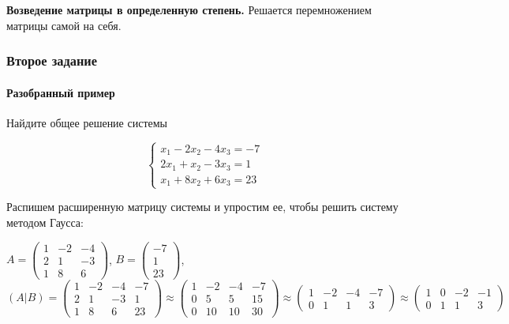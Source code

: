 \documentclass{article}
\begin{document}
\begin{flushleft}
\textbf{Возведение матрицы в определенную степень.} Решается перемножением матрицы самой на себя. 


\subsubsection{Второе задание}

\paragraph{Разобранный пример}

Найдите общее решение системы

\begin{equation}
    \begin{cases}
        x_1 - 2x_2 - 4x_3 = -7 \\
        2x_1 + x_2 - 3x_3 = 1 \\
        x_1 + 8x_2 + 6x_3 = 23
    \end{cases}
\end{equation}

Распишем расширенную матрицу системы и упростим ее, чтобы решить систему методом Гаусса:

$A = \begin{pmatrix}
    1 & -2 & -4 \\
    2 & 1 & -3 \\
    1 & 8 & 6
\end{pmatrix}$, $B = \begin{pmatrix}
    -7 \\
    1 \\
    23
\end{pmatrix}$, $(A|B) = \begin{pmatrix}
    1 & -2 & -4 & -7 \\
    2 & 1 & -3 & 1 \\
    1 & 8 & 6 & 23
\end{pmatrix} \approx \begin{pmatrix}
    1 & -2 & -4 & -7 \\
    0 & 5 & 5 & 15 \\
    0 & 10 & 10 & 30
\end{pmatrix} \approx \begin{pmatrix}
    1 & -2 & -4 & -7 \\
    0 & 1 & 1 & 3
\end{pmatrix} \approx \begin{pmatrix}
    1 & 0 & -2 & -1 \\
    0 & 1 & 1 & 3
\end{pmatrix}$


\end{flushleft}
\end{document}
